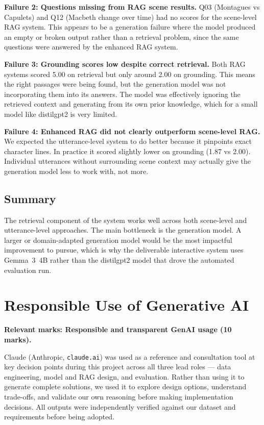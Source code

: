 \documentclass[10pt,conference]{IEEEtran}
\begin{document}
\textbf{Failure 2: Questions missing from RAG scene results.}
Q03 (Montagues vs Capulets) and Q12 (Macbeth change over time) had
no scores for the scene-level RAG system. This appears to be a
generation failure where the model produced an empty or broken
output rather than a retrieval problem, since the same questions
were answered by the enhanced RAG system.

\textbf{Failure 3: Grounding scores low despite correct retrieval.}
Both RAG systems scored 5.00 on retrieval but only around 2.00 on
grounding. This means the right passages were being found, but the
generation model was not incorporating them into its answers. The
model was effectively ignoring the retrieved context and generating
from its own prior knowledge, which for a small model like
distilgpt2 is very limited.

\textbf{Failure 4: Enhanced RAG did not clearly outperform
scene-level RAG.}
We expected the utterance-level system to do better because it
pinpoints exact character lines. In practice it scored slightly
lower on grounding (1.87 vs 2.00). Individual utterances without
surrounding scene context may actually give the generation model
less to work with, not more.

\subsection{Summary}

The retrieval component of the system works well across both
scene-level and utterance-level approaches. The main bottleneck is
the generation model. A larger or domain-adapted generation model
would be the most impactful improvement to pursue, which is why the
deliverable interactive system uses Gemma~3~4B rather than the
distilgpt2 model that drove the automated evaluation run.

\section{Responsible Use of Generative AI}
\label{sec:genai}

\textbf{Relevant marks: Responsible and transparent GenAI usage
(10 marks).}

Claude (Anthropic, \texttt{claude.ai}) was used as a reference and
consultation tool at key decision points during this project across
all three lead roles --- data engineering, model and RAG design,
and evaluation. Rather than using it to generate complete solutions,
we used it to explore design options, understand trade-offs, and
validate our own reasoning before making implementation decisions.
All outputs were independently verified against our dataset and
requirements before being adopted.
\end{document}
